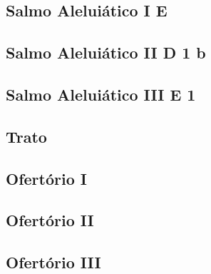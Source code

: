 \subsection[Salmo Aleluiático I]{Salmo Aleluiático I \textmd{E \protect\GreStar}}\label{subsection:liturgia-defunctorum/missa-pro-defunctis/psalmus-alleluiaticus-1}

\AllowPageFlush

\subsection[Salmo Aleluiático II]{Salmo Aleluiático II \textmd{D 1 b}}\label{subsection:liturgia-defunctorum/missa-pro-defunctis/psalmus-alleluiaticus-2}

\AllowPageFlush

\subsection[Salmo Aleluiático III]{Salmo Aleluiático III \textmd{E 1}}\label{subsection:liturgia-defunctorum/missa-pro-defunctis/psalmus-alleluiaticus-3}

\subsection{Trato}\label{subsection:liturgia-defunctorum/missa-pro-defunctis/tractus}

\subsection{Ofertório I}\label{subsection:liturgia-defunctorum/missa-pro-defunctis/offertorium-1}

\subsection{Ofertório II}\label{subsection:liturgia-defunctorum/missa-pro-defunctis/offertorium-2}

\AllowPageFlush

\subsection{Ofertório III}\label{subsection:liturgia-defunctorum/missa-pro-defunctis/offertorium-3}

